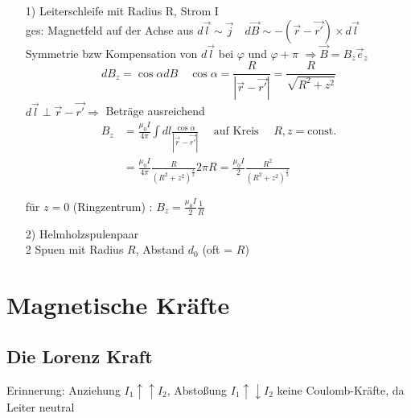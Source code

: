 \documentclass[titlepage,12pt,a4paper,ngerman]{report}
\newcommand{\tx}[1]{\textrm{#1}}
\begin{document}
\begin{itemize}
	\item[1)] Leiterschleife mit Radius R, Strom I\\
	ges: Magnetfeld auf der Achse aus $ d\vec{l} \sim \vec{j} \quad d \vec{B} \sim - (\vec{r} - \vec{r'}) \times d\vec{l} $\\
	Symmetrie bzw Kompensation von $ d\vec{l} $ bei $ \varphi $ und $\varphi + \pi$ $ \Rightarrow \vec{B} = B_z \vec{e}_z $\\
	$$ dB_z = \cos \alpha d B \quad \cos \alpha = \frac{R}{|\vec{r} - \vec{r'}|}  = \frac{R}{\sqrt{R^2 + z^2}}$$
	$ d\vec{l} \perp \vec{r} - \vec{r'} \Rightarrow $ Beträge ausreichend\\
	\begin{align*}
	B_z & = \frac{\mu_0 I }{4 \pi} \int d l \frac{\cos \alpha }{|\vec{r} - \vec{r'}|} \quad \tx{ auf Kreis } \quad R,z = \tx{const.} \\
	& = \frac{\mu_0 I }{4 \pi} \frac{R}{(R^2 + z^2 )^{\frac{3}{2}}} 2 \pi R = \frac{\mu_0 I }{2} \frac{ R^2}{(R^2 + z^2 ) ^{\frac{3}{2}}}
	\end{align*}
	
	für $ z=0 $ (Ringzentrum) : $ B_z = \frac{\mu_0 I}{2} \frac{1}{R} $ 
	\item[2)] Helmholzspulenpaar\\
	2 Spuen mit Radius $ R $, Abstand $ d_0 $ (oft = $ R $)
	
\end{itemize}

\section{Magnetische Kräfte}
\subsection{Die Lorenz Kraft}
Erinnerung: Anziehung $  I_1 \uparrow \uparrow I_2 $, Abstoßung $ I_1 \uparrow \downarrow I_2 $ keine Coulomb-Kräfte, da Leiter neutral
\end{document}
